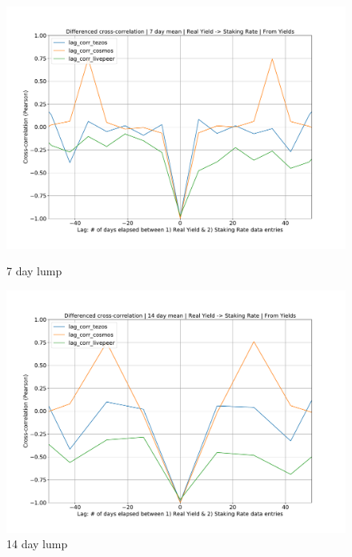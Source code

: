 \documentclass[longbibliography,nofootinbib]{revtex4-1}
\begin{document}
\begin{figure}
 \centering
    \begin{minipage}{0.5\textwidth}
        \centering
        \includegraphics[width=1\textwidth]{graphs/CrossCorr_Yields_DIF_7.pdf}
        \caption{7 day lump}
    \end{minipage}\hfill
    \begin{minipage}{0.5\textwidth}
        \centering
        \includegraphics[width=1\textwidth]{graphs/CrossCorr_Yields_DIF_14.pdf}
        \caption{14 day lump}
    \end{minipage}
    \begin{minipage}{0.5\textwidth}
        \centering

\end{minipage}
\end{figure}
\end{document}
